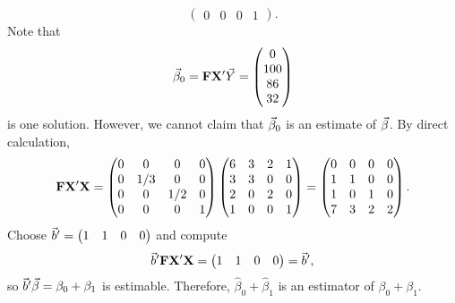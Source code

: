 \begin{Example}{}{}
\[\begin{pmatrix}
            0 & 0   & 0   & 1
        \end{pmatrix}. \]
    Note that
    \[ \vec{\beta}_0=\mathbf{F}\mathbf{X}'\vec{Y}=
        \begin{pmatrix}
            0 \\100\\86\\32
        \end{pmatrix} \]
    is one solution.
    However, we cannot claim that $ \vec{\beta}_0 $ is an estimate of $ \vec{\beta} $.
    By direct calculation,
    \[ \mathbf{F}\mathbf{X}'\mathbf{X}
        =\begin{pmatrix}
            0 & 0   & 0   & 0 \\
            0 & 1/3 & 0   & 0 \\
            0 & 0   & 1/2 & 0 \\
            0 & 0   & 0   & 1
        \end{pmatrix}\begin{pmatrix}
            6 & 3 & 2 & 1 \\
            3 & 3 & 0 & 0 \\
            2 & 0 & 2 & 0 \\
            1 & 0 & 0 & 1
        \end{pmatrix}=\begin{pmatrix}
            0 & 0 & 0 & 0 \\
            1 & 1 & 0 & 0 \\
            1 & 0 & 1 & 0 \\
            7 & 3 & 2 & 2
        \end{pmatrix}. \]
    Choose $ \vec{b}'=\begin{pmatrix}
            1 & 1 & 0 & 0
        \end{pmatrix} $ and compute
    \[ \vec{b}'\mathbf{F}\mathbf{X}'\mathbf{X}=\begin{pmatrix}
            1 & 1 & 0 & 0
        \end{pmatrix}=\vec{b}', \]
    so $ \vec{b}'\vec{\beta}=\beta_0+\beta_1 $ is estimable. Therefore, $ \hat{\beta}_0+\hat{\beta}_1 $ is an estimator of $ \beta_0+\beta_1 $.
\end{Example}